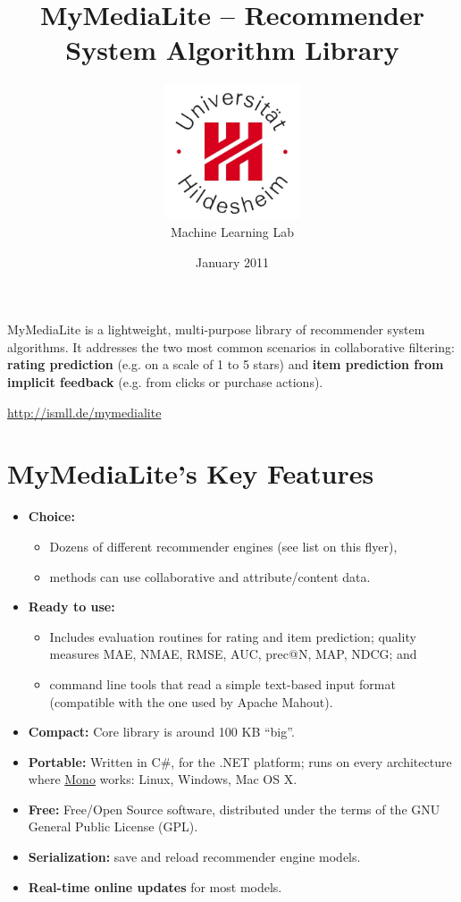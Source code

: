 \documentclass[a4paper, foldmark, 12pt]{leaflet}
\title{MyMediaLite -- Recommender System Algorithm Library}
\author{
	\includegraphics[width=4.0cm]{fig/uni-hildesheim-400x400.jpg}\\
	Machine Learning Lab
}
\date{January 2011}
\begin{document}
\maketitle

MyMediaLite is a lightweight, multi-purpose library
of recommender system algorithms.
It addresses the two most common scenarios in collaborative filtering:
\textbf{rating prediction} (e.g. on a scale of 1 to 5 stars)
and \textbf{item prediction from implicit feedback} (e.g. from clicks or purchase actions).

\begin{center}
	\url{http://ismll.de/mymedialite}
\end{center}

\newpage

\section{MyMediaLite's Key Features}


\begin{itemize}
	\item \textbf{Choice:}
		\begin{itemize}
			\item Dozens of different recommender engines (see list on this flyer),
			\item methods can use collaborative and attribute/content data.
		\end{itemize}
	\item \textbf{Ready to use:}
		\begin{itemize}
			\item Includes evaluation routines for rating and item prediction;
			      quality measures MAE, NMAE, RMSE, AUC, prec@N, MAP, NDCG; and
			\item command line tools that read a simple text-based input format
                              (compatible with the one used by Apache Mahout).
		\end{itemize}
	\item \textbf{Compact:} Core library is around 100 KB ``big''.
	\item \textbf{Portable:} Written in C\#, for the .NET platform;
	      runs on every architecture where \href{www.mono-project.com}{Mono} works:
	      Linux, Windows, Mac OS X.
	\item \textbf{Free:} Free/Open Source software, distributed under the terms of the
	      GNU General Public License (GPL).
	\item \textbf{Serialization:} save and reload recommender engine models.
	\item \textbf{Real-time online updates} for most models.
\end{itemize}
\end{document}
